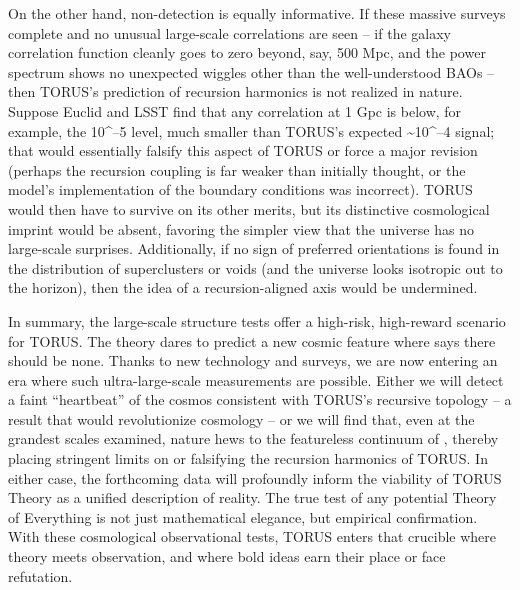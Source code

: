 \documentclass[
]{article}
\begin{document}
On the other hand, non-detection is equally informative. If these
massive surveys complete and no unusual large-scale correlations are
seen -- if the galaxy correlation function cleanly goes to zero beyond,
say, 500 Mpc, and the power spectrum shows no unexpected wiggles other
than the well-understood BAOs -- then TORUS's prediction of recursion
harmonics is not realized in nature. Suppose Euclid and LSST find that
any correlation at 1 Gpc is below, for example, the 10\^{}--5 level,
much smaller than TORUS's expected \textasciitilde10\^{}--4 signal; that
would essentially falsify this aspect of TORUS or force a major revision
(perhaps the recursion coupling is far weaker than initially thought, or
the model's implementation of the boundary conditions was incorrect).
TORUS would then have to survive on its other merits, but its
distinctive cosmological imprint would be absent, favoring the simpler
\LambdaCDM view that the universe has no large-scale surprises. Additionally,
if no sign of preferred orientations is found in the distribution of
superclusters or voids (and the universe looks isotropic out to the
horizon), then the idea of a recursion-aligned axis would be undermined.

In summary, the large-scale structure tests offer a high-risk,
high-reward scenario for TORUS. The theory dares to predict a new cosmic
feature where \LambdaCDM says there should be none. Thanks to new technology
and surveys, we are now entering an era where such ultra-large-scale
measurements are possible. Either we will detect a faint ``heartbeat''
of the cosmos consistent with TORUS's recursive topology -- a result
that would revolutionize cosmology -- or we will find that, even at the
grandest scales examined, nature hews to the featureless continuum of
\LambdaCDM, thereby placing stringent limits on or falsifying the recursion
harmonics of TORUS. In either case, the forthcoming data will profoundly
inform the viability of TORUS Theory as a unified description of
reality. The true test of any potential Theory of Everything is not just
mathematical elegance, but empirical confirmation. With these
cosmological observational tests, TORUS enters that crucible where
theory meets observation, and where bold ideas earn their place or face
refutation.
\end{document}
